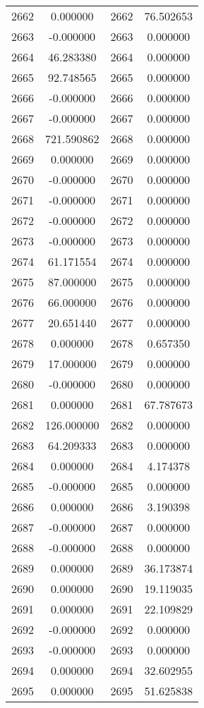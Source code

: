 \documentclass[12pt]{article}
\begin{document}
\begin{longtable}{@{}cccc@{}}
2662 & 0.000000 & 2662 & 76.502653 \\
2663 & -0.000000 & 2663 & 0.000000 \\
2664 & 46.283380 & 2664 & 0.000000 \\
2665 & 92.748565 & 2665 & 0.000000 \\
2666 & -0.000000 & 2666 & 0.000000 \\
2667 & -0.000000 & 2667 & 0.000000 \\
2668 & 721.590862 & 2668 & 0.000000 \\
2669 & 0.000000 & 2669 & 0.000000 \\
2670 & -0.000000 & 2670 & 0.000000 \\
2671 & -0.000000 & 2671 & 0.000000 \\
2672 & -0.000000 & 2672 & 0.000000 \\
2673 & -0.000000 & 2673 & 0.000000 \\
2674 & 61.171554 & 2674 & 0.000000 \\
2675 & 87.000000 & 2675 & 0.000000 \\
2676 & 66.000000 & 2676 & 0.000000 \\
2677 & 20.651440 & 2677 & 0.000000 \\
2678 & 0.000000 & 2678 & 0.657350 \\
2679 & 17.000000 & 2679 & 0.000000 \\
2680 & -0.000000 & 2680 & 0.000000 \\
2681 & 0.000000 & 2681 & 67.787673 \\
2682 & 126.000000 & 2682 & 0.000000 \\
2683 & 64.209333 & 2683 & 0.000000 \\
2684 & 0.000000 & 2684 & 4.174378 \\
2685 & -0.000000 & 2685 & 0.000000 \\
2686 & 0.000000 & 2686 & 3.190398 \\
2687 & -0.000000 & 2687 & 0.000000 \\
2688 & -0.000000 & 2688 & 0.000000 \\
2689 & 0.000000 & 2689 & 36.173874 \\
2690 & 0.000000 & 2690 & 19.119035 \\
2691 & 0.000000 & 2691 & 22.109829 \\
2692 & -0.000000 & 2692 & 0.000000 \\
2693 & -0.000000 & 2693 & 0.000000 \\
2694 & 0.000000 & 2694 & 32.602955 \\
2695 & 0.000000 & 2695 & 51.625838 \\

\end{longtable}
\end{document}
